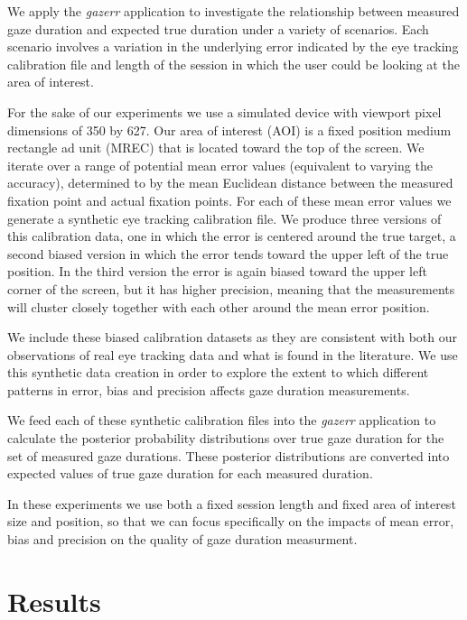 \documentclass[12pt,a4paper]{article}
\numberwithin{equation}{section}
\begin{document}
We apply the \textit{gazerr} application to investigate the relationship between 
measured gaze duration and expected true duration under a variety of scenarios. 
Each scenario involves a variation in the underlying error indicated by the eye tracking 
calibration file and length of the session in which the user could be looking at 
the area of interest.

For the sake of our experiments we use a simulated device with viewport pixel 
dimensions of 350 by 627. Our area of interest (AOI) is a fixed position medium 
rectangle ad unit (MREC) that is located toward the top of the screen. 
We iterate over a range of potential mean error values 
(equivalent to varying the accuracy), determined to by the mean Euclidean distance 
between the measured fixation point and actual fixation points.
For each of these mean error values we generate a synthetic eye tracking calibration 
file. We produce three versions of this calibration data, one in which the error 
is centered around the true target, a second biased version in which the error tends 
toward the upper left of the true position. In the third version the error is again
biased toward the upper left corner of the screen, but it has higher precision, 
meaning that the measurements will cluster closely together with each other around
the mean error position.

We include these biased calibration datasets as they are consistent with both our 
observations of real eye tracking data and what is found in the literature\cite{}.
We use this synthetic data creation in order to explore the extent to which different
patterns in error, bias and precision affects gaze duration measurements.

We feed each of these synthetic calibration files into the \textit{gazerr} application
to calculate the posterior probability distributions over true gaze duration for 
the set of measured gaze durations. These posterior distributions are converted 
into expected values of true gaze duration for each measured duration.

In these experiments we use both a fixed session length and fixed area of interest
size and position, so that we can focus specifically on the impacts of mean
error, bias and precision on the quality of gaze duration measurment.

\section{Results}
\end{document}
